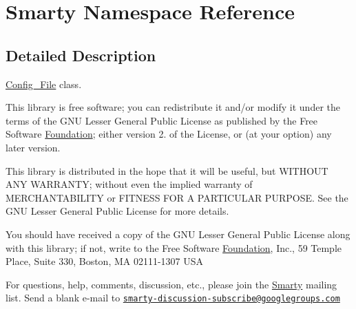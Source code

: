 \hypertarget{namespace_smarty}{}\section{Smarty Namespace Reference}
\label{namespace_smarty}


\subsection{Detailed Description}
\mbox{\hyperlink{class_config___file}{Config\+\_\+\+File}} class.

This library is free software; you can redistribute it and/or modify it under the terms of the G\+NU Lesser General Public License as published by the Free Software \mbox{\hyperlink{namespace_foundation}{Foundation}}; either version 2. of the License, or (at your option) any later version.

This library is distributed in the hope that it will be useful, but W\+I\+T\+H\+O\+UT A\+NY W\+A\+R\+R\+A\+N\+TY; without even the implied warranty of M\+E\+R\+C\+H\+A\+N\+T\+A\+B\+I\+L\+I\+TY or F\+I\+T\+N\+E\+SS F\+OR A P\+A\+R\+T\+I\+C\+U\+L\+AR P\+U\+R\+P\+O\+SE. See the G\+NU Lesser General Public License for more details.

You should have received a copy of the G\+NU Lesser General Public License along with this library; if not, write to the Free Software \mbox{\hyperlink{namespace_foundation}{Foundation}}, Inc., 59 Temple Place, Suite 330, Boston, MA 02111-\/1307 U\+SA

For questions, help, comments, discussion, etc., please join the \mbox{\hyperlink{class_smarty}{Smarty}} mailing list. Send a blank e-\/mail to \href{mailto:smarty-discussion-subscribe@googlegroups.com}{\tt smarty-\/discussion-\/subscribe@googlegroups.\+com}

